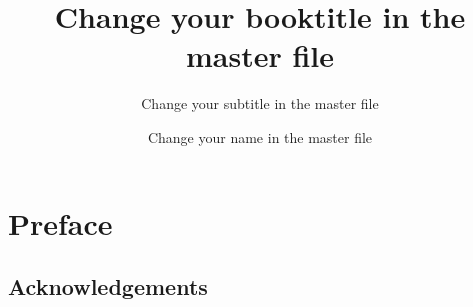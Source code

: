 \documentclass[number=?? %
                ,series=lnls, %
                ,isbn=xxx-x-xxxxxx-xx-x, %
                ,url=http://langsci-press.org/catalog/book/0, %
	        ,output=long    %
	        ,draftmode  
		  ]{LSP/langsci}
\title{Change your booktitle in the master file}  %
\subtitle{Change your subtitle in the master file}
\author{Change your name in the master file}
\begin{document}
               
                           
\maketitle                

\frontmatter

\chapter*{Preface} 
\section*{Acknowledgements} 

\tableofcontents      

\mainmatter         



 

\backmatter


                               
\end{document}
